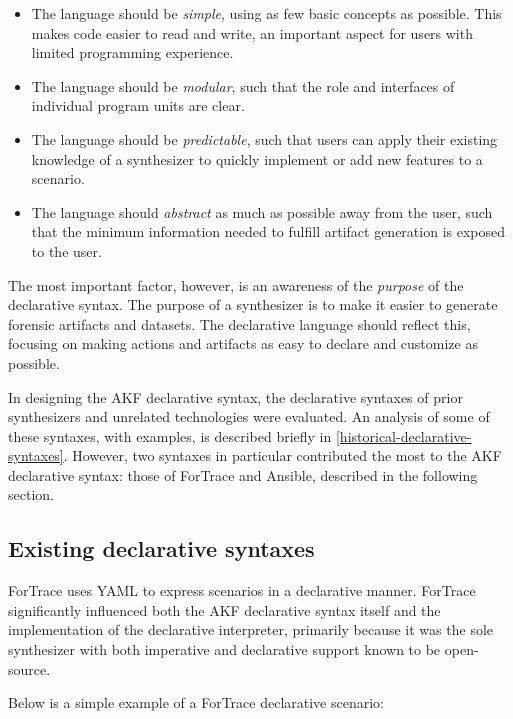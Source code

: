 \documentclass[letterpaper,12pt]{report}
\def\tightlist{}
\begin{document}
\begin{itemize}
\tightlist
\item
  The language should be \emph{simple}, using as few basic concepts as
  possible. This makes code easier to read and write, an important
  aspect for users with limited programming experience.
\item
  The language should be \emph{modular}, such that the role and
  interfaces of individual program units are clear.
\item
  The language should be \emph{predictable}, such that users can apply
  their existing knowledge of a synthesizer to quickly implement or add
  new features to a scenario.
\item
  The language should \emph{abstract} as much as possible away from the
  user, such that the minimum information needed to fulfill artifact
  generation is exposed to the user.
\end{itemize}

The most important factor, however, is an awareness of the
\emph{purpose} of the declarative syntax. The purpose of a synthesizer
is to make it easier to generate forensic artifacts and datasets. The
declarative language should reflect this, focusing on making actions and
artifacts as easy to declare and customize as possible.

In designing the AKF declarative syntax, the declarative syntaxes of
prior synthesizers and unrelated technologies were evaluated. An
analysis of some of these syntaxes, with examples, is described briefly
in \autoref{historical-declarative-syntaxes}.
However, two syntaxes in particular contributed the most to the AKF
declarative syntax: those of ForTrace and Ansible, described in the
following section.

\subsection{Existing declarative
syntaxes}\label{existing-declarative-syntaxes}

ForTrace \cite{gobelForTraceHolisticForensic2022} uses YAML to
express scenarios in a declarative manner. ForTrace significantly
influenced both the AKF declarative syntax itself and the implementation
of the declarative interpreter, primarily because it was the sole
synthesizer with both imperative and declarative support known to be
open-source.

Below is a simple example of a ForTrace declarative scenario:
\end{document}
